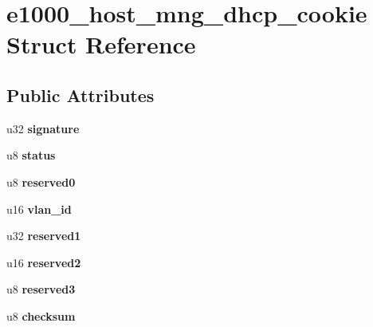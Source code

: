 \hypertarget{structe1000__host__mng__dhcp__cookie}{
\section{e1000\_\-host\_\-mng\_\-dhcp\_\-cookie Struct Reference}
\label{structe1000__host__mng__dhcp__cookie}
}
\subsection*{Public Attributes}
\begin{DoxyCompactItemize}
\item 
\hypertarget{structe1000__host__mng__dhcp__cookie_a3bba86b720a8d4d568ea6596cbc0901c}{
u32 {\bfseries signature}}
\label{structe1000__host__mng__dhcp__cookie_a3bba86b720a8d4d568ea6596cbc0901c}

\item 
\hypertarget{structe1000__host__mng__dhcp__cookie_a0892329eb70a0efc78ad7f4500eb3fe0}{
u8 {\bfseries status}}
\label{structe1000__host__mng__dhcp__cookie_a0892329eb70a0efc78ad7f4500eb3fe0}

\item 
\hypertarget{structe1000__host__mng__dhcp__cookie_aa83937a7e0b7eecd643b8f618d838bb8}{
u8 {\bfseries reserved0}}
\label{structe1000__host__mng__dhcp__cookie_aa83937a7e0b7eecd643b8f618d838bb8}

\item 
\hypertarget{structe1000__host__mng__dhcp__cookie_ac0fa6fd99bb9fc1b754f272f8e46ffe4}{
u16 {\bfseries vlan\_\-id}}
\label{structe1000__host__mng__dhcp__cookie_ac0fa6fd99bb9fc1b754f272f8e46ffe4}

\item 
\hypertarget{structe1000__host__mng__dhcp__cookie_af2911a8a8698197cbc37289a7509e0c7}{
u32 {\bfseries reserved1}}
\label{structe1000__host__mng__dhcp__cookie_af2911a8a8698197cbc37289a7509e0c7}

\item 
\hypertarget{structe1000__host__mng__dhcp__cookie_af603fa10a87d6c8cffd4eb528ebf6809}{
u16 {\bfseries reserved2}}
\label{structe1000__host__mng__dhcp__cookie_af603fa10a87d6c8cffd4eb528ebf6809}

\item 
\hypertarget{structe1000__host__mng__dhcp__cookie_a91d99adc16ce074df864246bd656b43f}{
u8 {\bfseries reserved3}}
\label{structe1000__host__mng__dhcp__cookie_a91d99adc16ce074df864246bd656b43f}

\item 
\hypertarget{structe1000__host__mng__dhcp__cookie_ad79187cdb217c311122a1aa618ed8aaa}{
u8 {\bfseries checksum}}
\label{structe1000__host__mng__dhcp__cookie_ad79187cdb217c311122a1aa618ed8aaa}

\end{DoxyCompactItemize}


